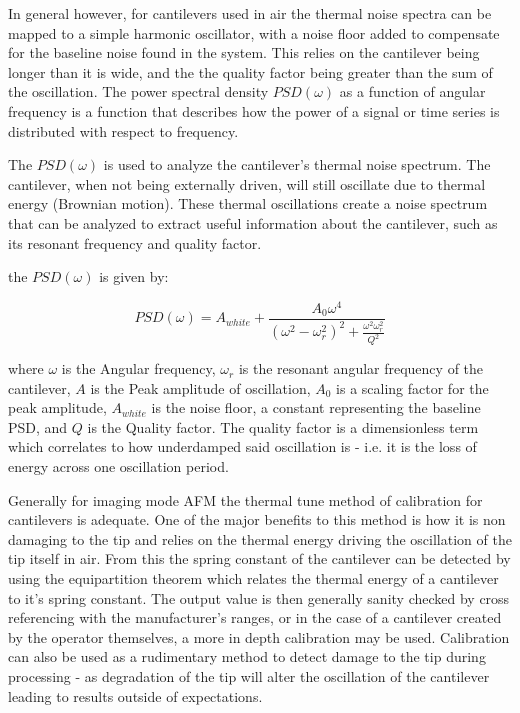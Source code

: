 In general however, for cantilevers used in air the thermal noise spectra can be mapped to a simple harmonic oscillator, with a noise floor added to compensate for the baseline noise found in the system. This relies on the cantilever being longer than it is wide, and the the quality factor being greater than the sum of the oscillation. The power spectral density $PSD(\omega)$ as a function of angular frequency is a function that describes how the power of a signal or time series is distributed with respect to frequency.

The $PSD(\omega)$ is used to analyze the cantilever's thermal noise spectrum. The cantilever, when not being externally driven, will still oscillate due to thermal energy (Brownian motion). These thermal oscillations create a noise spectrum that can be analyzed to extract useful information about the cantilever, such as its resonant frequency and quality factor.

the $PSD(\omega)$ is given by:

\begin{equation}
PSD(\omega) = A_{white} + \frac{A_0 \omega^4}{(\omega^2 - \omega^2_r)^2 + \frac{\omega^2 \omega^2_r}{Q^2}}
\end{equation}

where $\omega$ is the Angular frequency, $\omega_r$ is the resonant angular frequency of the cantilever, $A$ is the Peak amplitude of oscillation, $A_0$ is a scaling factor for the peak amplitude, $A_{white}$ is the noise floor, a constant representing the baseline PSD, and $Q$ is the Quality factor. The quality factor is a dimensionless term which correlates to how underdamped said oscillation is - i.e. it is the loss of energy across one oscillation period. 

Generally for imaging mode AFM the thermal tune method of calibration for cantilevers is adequate. One of the major benefits to this method is how it is non damaging to the tip and relies on the thermal energy driving the oscillation of the tip itself in air. From this the spring constant of the cantilever can be detected by using the equipartition theorem which relates the thermal energy of a cantilever to it's spring constant. The output value is then generally sanity checked by cross referencing with the manufacturer's ranges, or in the case of a cantilever created by the operator themselves, a more in depth calibration may be used. Calibration can also be used as a rudimentary method to detect damage to the tip during processing - as degradation of the tip will alter the oscillation of the cantilever leading to results outside of expectations. 

